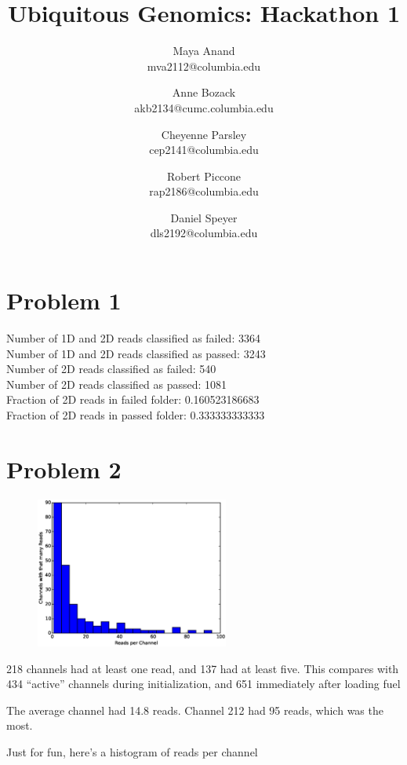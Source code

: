 \documentclass[11pt]{article}
\title{Ubiquitous Genomics: Hackathon 1}
\author{
  Maya Anand\\ mva2112@columbia.edu \and
  Anne Bozack\\ akb2134@cumc.columbia.edu \and
  Cheyenne Parsley\\ cep2141@columbia.edu \and
  Robert Piccone\\ rap2186@columbia.edu \and
  Daniel Speyer\\ dls2192@columbia.edu}
\begin{document}
\maketitle
\section*{Problem 1}
Number of 1D and 2D reads classified as failed: 3364\\
Number of 1D and 2D reads classified as passed: 3243\\
Number of 2D reads classified as failed: 540\\
Number of 2D reads classified as passed: 1081\\
Fraction of 2D reads in failed folder: 0.160523186683\\
Fraction of 2D reads in passed folder: 0.333333333333\\
\section*{Problem 2}
\begin{figure}
  \vspace{-20pt}
  \includegraphics[width=2.5in]{part2hist}
  \vspace{-20pt}
\end{figure}
218 channels had at least one read, and 137 had at least five.  
This compares with 434 ``active'' channels during initialization, and 651 immediately after loading fuel

The average channel had 14.8 reads. 
Channel 212 had 95 reads, which was the most.

Just for fun, here's a histogram of reads per channel\\
\end{document}
